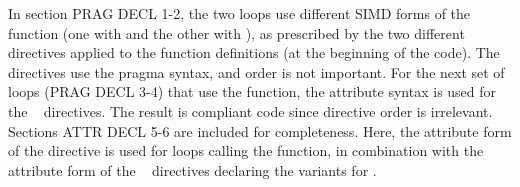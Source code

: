 In section PRAG DECL 1-2, the two loops use different SIMD forms of the  function
(one with  and the other with ), 
as prescribed by the two different ~ directives
applied to the  function definitions (at the beginning of the code). 
The directives use the pragma syntax, and order is not important. 
For the next set of loops 
(PRAG DECL 3-4) that use the  function, the attribute syntax is 
used for the ~ directives. 
The result is compliant code since directive order is irrelevant.
Sections ATTR DECL 5-6 are included for completeness. Here, the attribute 
form of the  directive is used for loops calling the  function, 
in combination with the attribute form of the ~ 
directives declaring the variants for .

